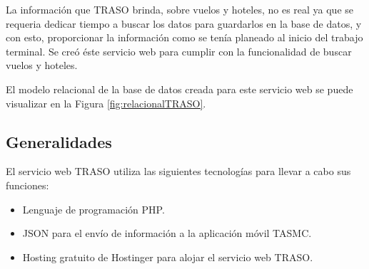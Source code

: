 La información que TRASO brinda, sobre vuelos y hoteles, no es real ya que se requeria dedicar tiempo a buscar los datos para guardarlos en la base de datos, y con esto, proporcionar la información como se tenía planeado al inicio del trabajo terminal. Se creó éste servicio web para cumplir con la funcionalidad de buscar vuelos y hoteles.

El modelo relacional de la base de datos creada para este servicio web se puede visualizar en la Figura \ref{fig:relacionalTRASO}.

\subsection{Generalidades}
El servicio web TRASO utiliza las siguientes tecnologías para llevar a cabo sus funciones:
\begin{itemize}
 \item Lenguaje de programación PHP.
 \item JSON para el envío de información a la aplicación móvil TASMC.
 \item Hosting gratuito de Hostinger para alojar el servicio web TRASO.
\end{itemize}
\clearpage